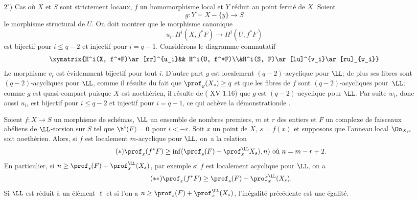 $2^\circ)$ Cas o\`u $X$ et $S$ sont strictement locaux, $f$ un homomorphisme local et $Y$ r\'eduit au point ferm\'e de $X$. Soient
$$g:Y=X-\{y\}\to S$$
le morphisme structural de $U$. On doit montrer que le morphisme canonique
$$u_i:H^i(X, f^*F)\to H^i(U, f^*F)$$
est bijectif pour $i\leq q-2$ et injectif pour $i=q-1$. Consid\'erons le diagramme commutatif
$$
\xymatrix{H^i(X, f^*F)\ar[rr]^{u_i}&& H^i(U, f^*F)\\&H^i(S, F)\ar[lu]^{v_i}\ar[ru]_{w_i}}$$
Le morphisme $v_i$ est \'evidemment bijectif pour tout $i$. D'autre part $g$ est localement $(q-2)$-acyclique pour $\LL$; de plus ses fibres sont $(q-2)$-acycliques pour $\LL$, comme il r\'esulte du fait que $\prof_y(X_s)\geq q$ et que les fibres de $f$ sont $(q-2)$-acycliques pour~$\LL$; comme $g$ est quasi-compact puisque $X$ est noeth\'erien, il r\'esulte de ( XV 1.16) que $g$ est $(q-2)$-acyclique pour $\LL$. Par suite $w_i$, donc aussi $u_i$, est bijectif pour $i\leq q-2$ et injectif pour $i=q-1$, ce qui ach\`eve la d\'emonstration\pageoriginale de .

\begin{corollaire} \label{XIV.1.15}
Soient $f:X\to S$ un morphisme de sch\'emas, $\LL$ un ensemble de nombres premiers, $m$ et $r$ des entiers et $F$ un complexe de faisceaux ab\'eliens de $\LL$-torsion sur $S$ tel que $\h^i(F)=0$ pour $i<-r$. Soit $x$ un point de $X,\ s=f(x)$ et supposons que l'anneau local $\Oo_{X, x}$ soit noeth\'erien. Alors, si $f$ est localement $m$-acyclique pour $\LL$, on~a la relation
\begin{equation*} \label{eq:XIV.115..*} \tag{$*$} {\prof_x(f^*F)\geq\inf(\prof_s(F)+\prof^\LL_xX_s), n)\text{ o\`u }n=m-r+2.}
\end{equation*}
En particulier, si $n\geq\prof_s(F)+\prof_x^\LL(X_s)$, par exemple si $f$ est localement acyclique pour $\LL$, on a
\begin{equation*} \label{eq:XIV.15.**} \tag{$**$} {\prof_x(f^*F)\geq\prof_s(F)+\prof_x^\LL(X_s).}
\end{equation*}
Si $\LL$ est r\'eduit \`a un \'el\'ement $\ell$ et si l'on a $n\geq \prof_s(F)+\prof_x^\LL(X_s)$, l'in\'egalit\'e pr\'ec\'edente est une \'egalit\'e.
\end{corollaire}


